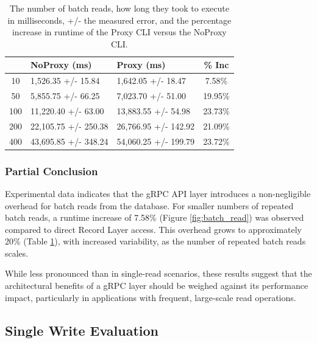 \documentclass[sigconf]{acmart}
\begin{document}
\begin{table}[h]
\begin{tabular}{|c|l|l|c|}
    \hline
    \rowcolor[HTML]{656565} 
    \multicolumn{1}{|c}{\cellcolor[HTML]{656565}{\color[HTML]{FFFFFF} \textbf{N}}} &
    {\color[HTML]{FFFFFF} \textbf{NoProxy (ms)}} &
    {\color[HTML]{FFFFFF} \textbf{Proxy (ms)}} &
    {\color[HTML]{FFFFFF} \textbf{\% Inc}} \\ \hline
    10  & 1,526.35 +/- 15.84   & 1,642.05 +/- 18.47   & 7.58\%  \\
    \rowcolor[HTML]{EFEFEF} 
    50  & 5,855.75 +/- 66.25   & 7,023.70 +/- 51.00   & 19.95\% \\
    100 & 11,220.40 +/- 63.00  & 13,883.55 +/- 54.98  & 23.73\% \\
    \rowcolor[HTML]{EFEFEF} 
    200 & 22,105.75 +/- 250.38 & 26,766.95 +/- 142.92 & 21.09\% \\
    400 & 43,695.85 +/- 348.24 & 54,060.25 +/- 199.79 & 23.72\% \\ \hline
\end{tabular}
\caption{The number of batch reads, how long they took to execute in milliseconds, +/- the measured error, and the percentage increase in runtime of the Proxy CLI versus the NoProxy CLI.}
\label{tab:batch_read}
\end{table}

\subsubsection{Partial Conclusion}

Experimental data indicates that the gRPC API layer introduces a non-negligible overhead for batch reads from the database.
For smaller numbers of repeated batch reads, a runtime increase of 7.58\% (Figure \ref{fig:batch_read}) was observed compared to direct Record Layer access.
This overhead grows to approximately 20\% (Table \ref{tab:batch_read}), with increased variability, as the number of repeated batch reads scales.

While less pronounced than in single-read scenarios, these results suggest that the architectural benefits of a gRPC layer should be weighed against its performance impact, particularly in applications with frequent, large-scale read operations.

\subsection{Single Write Evaluation}
\end{document}
